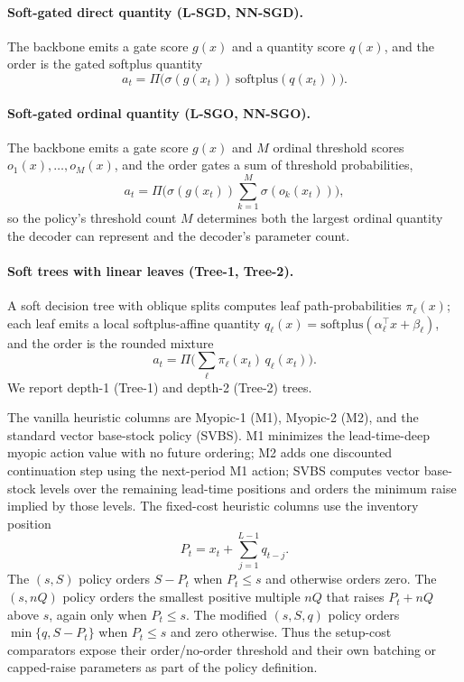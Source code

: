 \documentclass[11pt]{article}
\begin{document}
\paragraph{Soft-gated direct quantity (L-SGD, NN-SGD).}
The backbone emits a gate score $g(x)$ and a quantity score $q(x)$, and the order is the gated
softplus quantity
\[
a_t = \Pi\!\big(\sigma(g(x_t))\,\mathrm{softplus}(q(x_t))\big).
\]

\paragraph{Soft-gated ordinal quantity (L-SGO, NN-SGO).}
The backbone emits a gate score $g(x)$ and $M$ ordinal threshold scores
$o_1(x),\dots,o_M(x)$, and the order gates a sum of threshold probabilities,
\[
a_t = \Pi\!\Big(\sigma(g(x_t))\sum_{k=1}^{M}\sigma(o_k(x_t))\Big),
\]
so the policy's threshold count $M$ determines both the largest ordinal quantity the decoder can
represent and the decoder's parameter count.

\paragraph{Soft trees with linear leaves (Tree-1, Tree-2).}
A soft decision tree with oblique splits computes leaf path-probabilities $\pi_\ell(x)$; each leaf
emits a local softplus-affine quantity $q_\ell(x)=\mathrm{softplus}(\alpha_\ell^\top x+\beta_\ell)$,
and the order is the rounded mixture
\[
a_t = \Pi\!\Big(\sum_\ell \pi_\ell(x_t)\,q_\ell(x_t)\Big).
\]
We report depth-1 (Tree-1) and depth-2 (Tree-2) trees.

The vanilla heuristic columns are Myopic-1 (M1), Myopic-2 (M2), and the standard vector base-stock
policy (SVBS). M1 minimizes the lead-time-deep myopic action value with no future ordering; M2 adds
one discounted continuation step using the next-period M1 action; SVBS computes vector base-stock
levels over the remaining lead-time positions and orders the minimum raise implied by those levels.
The fixed-cost heuristic columns use the inventory position
\[
P_t=x_t+\sum_{j=1}^{L-1} q_{t-j}.
\]
The $(s,S)$ policy orders $S-P_t$ when $P_t\le s$ and otherwise orders zero. The $(s,nQ)$ policy
orders the smallest positive multiple $nQ$ that raises $P_t+nQ$ above $s$, again only when
$P_t\le s$. The modified $(s,S,q)$ policy orders $\min\{q,S-P_t\}$ when $P_t\le s$ and zero
otherwise. Thus the setup-cost comparators expose their order/no-order threshold and their own
batching or capped-raise parameters as part of the policy definition.
\end{document}
